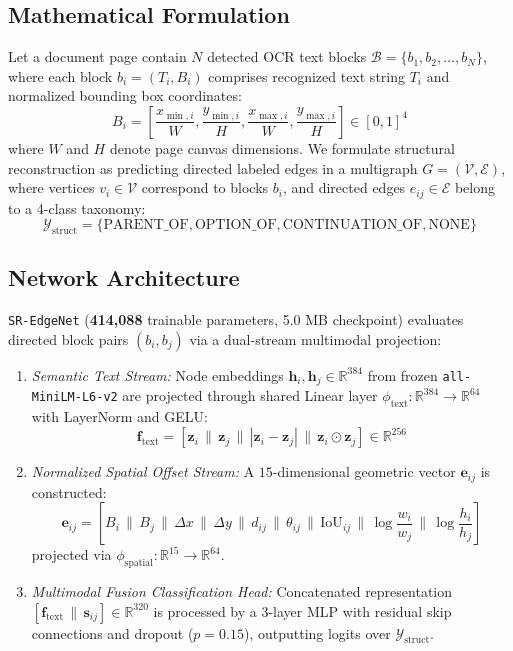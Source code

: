 \documentclass[conference]{IEEEtran}
\begin{document}
\subsection{Mathematical Formulation}
Let a document page contain $N$ detected OCR text blocks $\mathcal{B} = \{b_1, b_2, \dots, b_N\}$, where each block $b_i = (T_i, B_i)$ comprises recognized text string $T_i$ and normalized bounding box coordinates:
\begin{equation}
B_i = \left[ \frac{x_{\min, i}}{W}, \frac{y_{\min, i}}{H}, \frac{x_{\max, i}}{W}, \frac{y_{\max, i}}{H} \right] \in [0, 1]^4
\end{equation}
where $W$ and $H$ denote page canvas dimensions. We formulate structural reconstruction as predicting directed labeled edges in a multigraph $G = (\mathcal{V}, \mathcal{E})$, where vertices $v_i \in \mathcal{V}$ correspond to blocks $b_i$, and directed edges $e_{ij} \in \mathcal{E}$ belong to a 4-class taxonomy:
\begin{equation}
\mathcal{Y}_{\text{struct}} = \{\text{PARENT\_OF}, \text{OPTION\_OF}, \text{CONTINUATION\_OF}, \text{NONE}\}
\end{equation}

\subsection{Network Architecture}
\texttt{SR-EdgeNet} (\textbf{414,088} trainable parameters, 5.0 MB checkpoint) evaluates directed block pairs $(b_i, b_j)$ via a dual-stream multimodal projection:
\begin{enumerate}
    \item \textit{Semantic Text Stream:} Node embeddings $\mathbf{h}_i, \mathbf{h}_j \in \mathbb{R}^{384}$ from frozen \texttt{all-MiniLM-L6-v2} are projected through shared Linear layer $\phi_{\text{text}}: \mathbb{R}^{384} \rightarrow \mathbb{R}^{64}$ with LayerNorm and GELU:
    \begin{equation}
    \mathbf{f}_{\text{text}} = \left[ \mathbf{z}_i \,\|\, \mathbf{z}_j \,\|\, |\mathbf{z}_i - \mathbf{z}_j| \,\|\, \mathbf{z}_i \odot \mathbf{z}_j \right] \in \mathbb{R}^{256}
    \end{equation}
    \item \textit{Normalized Spatial Offset Stream:} A $15$-dimensional geometric vector $\mathbf{e}_{ij}$ is constructed:
    \begin{equation}
    \mathbf{e}_{ij} = \left[ B_i \,\|\, B_j \,\|\, \Delta x \,\|\, \Delta y \,\|\, d_{ij} \,\|\, \theta_{ij} \,\|\, \text{IoU}_{ij} \,\|\, \log\frac{w_i}{w_j} \,\|\, \log\frac{h_i}{h_j} \right]
    \end{equation}
    projected via $\phi_{\text{spatial}}: \mathbb{R}^{15} \rightarrow \mathbb{R}^{64}$.
    \item \textit{Multimodal Fusion Classification Head:} Concatenated representation $[\mathbf{f}_{\text{text}} \,\|\, \mathbf{s}_{ij}] \in \mathbb{R}^{320}$ is processed by a 3-layer MLP with residual skip connections and dropout ($p = 0.15$), outputting logits over $\mathcal{Y}_{\text{struct}}$.
\end{enumerate}
\end{document}
